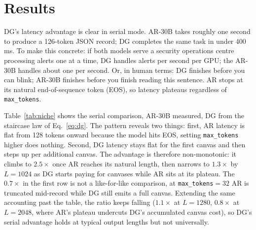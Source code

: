 \section{Results}
\label{sec:wins}

DG's latency advantage is clear in serial
mode. AR-30B takes roughly one second to produce a
126-token JSON record; DG completes the same task in under 400\,ms.
To make this concrete: if both models serve a security operations
centre processing alerts one at a time, DG handles \crossoverLambda{}
alerts per second per GPU; the AR-30B handles about one per second.
Or, in human terms: DG finishes before you can blink; AR-30B
finishes before you finish reading this sentence. AR stops
at its natural end-of-sequence token (EOS), so latency plateaus regardless of
\texttt{max\_tokens}.

Table~\ref{tab:niche} shows the serial comparison, AR-30B measured,
DG from the staircase law of Eq.~\ref{eq:dg}. The
pattern reveals two things: first, AR latency is flat from 128 tokens
onward because the model hits EOS, setting \texttt{max\_tokens}
higher does nothing. Second, DG latency stays flat for the first
canvas and then steps up per additional canvas. The advantage is
therefore non-monotonic: it climbs to $2.5\times$ once AR reaches its
natural length, then narrows to $1.3\times$ by $L{=}1024$ as DG starts
paying for canvases while AR sits at its plateau. The $0.7\times$ in
the first row is not a like-for-like comparison, at
\texttt{max\_tokens}${=}32$ AR is truncated mid-record while DG still
emits a full canvas. Extending the same accounting past the table, the
ratio keeps falling ($1.1\times$ at $L{=}1280$, $0.8\times$ at
$L{=}2048$, where AR's plateau undercuts DG's accumulated canvas cost),
so DG's serial advantage holds at typical output lengths but
not universally.

